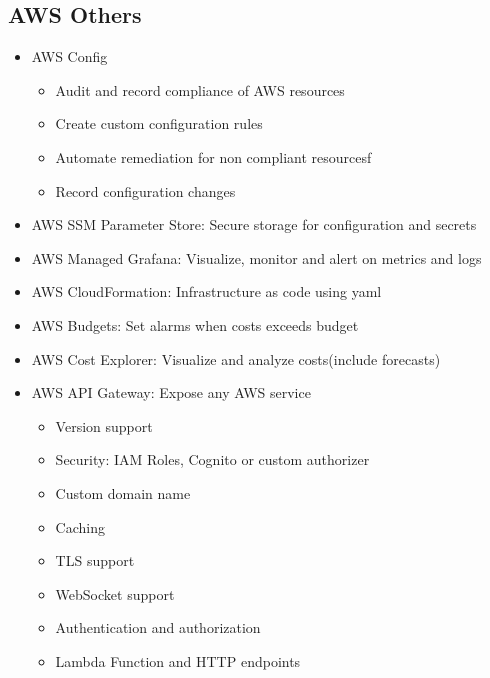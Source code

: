 \documentclass[../../main.tex]{subfiles}
\begin{document}
\subsection{AWS Others}
\begin{itemize}
    \item AWS Config
    \begin{itemize}
        \item Audit and record compliance of AWS resources
        \item Create custom configuration rules
        \item Automate remediation for non compliant resourcesf
        \item Record configuration changes
    \end{itemize}
    \item AWS SSM Parameter Store: Secure storage for configuration and secrets
    \item AWS Managed Grafana: Visualize, monitor and alert on metrics and logs
    \item AWS CloudFormation: Infrastructure as code using yaml
    \item AWS Budgets: Set alarms when costs exceeds budget
    \item AWS Cost Explorer: Visualize and analyze costs(include forecasts)
    \item AWS API Gateway: Expose any AWS service
    \begin{itemize}
        \item Version support
        \item Security: IAM Roles, Cognito or custom authorizer
        \item Custom domain name
        \item Caching
        \item TLS support
        \item WebSocket support
        \item Authentication and authorization
        \item Lambda Function and HTTP endpoints
    \end{itemize}
\end{itemize}
\end{document}
